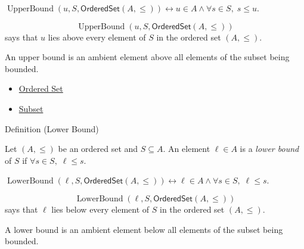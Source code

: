 \begin{remark*}
$\operatorname{UpperBound}(u,S,\mathsf{OrderedSet}(A,\leq))
\leftrightarrow u\in A\wedge \forall s\in S,\;s\leq u$.
\end{remark*}

\begin{remark*}
\[
  \operatorname{UpperBound}(u,S,\mathsf{OrderedSet}(A,\leq))
\] says that $u$
lies above every element of $S$ in the ordered set $(A,\leq)$.
\end{remark*}

\begin{remark*}[Interpretation]
An upper bound is an ambient element above all elements of the subset being
bounded.
\end{remark*}

\begin{dependencies}
\begin{itemize}
  \item \hyperref[def:ordered-set]{Ordered Set}
  \item \hyperref[def:subset]{Subset}
\end{itemize}
\end{dependencies}

\begin{definitionbox}{Definition (Lower Bound)}
\begin{definition}\label{def:lower-bound}
Let $(A,\leq)$ be an ordered set and $S \subseteq A$.
An element $\ell \in A$ is a \emph{lower bound} of $S$ if
$\forall s \in S,\; \ell \leq s$.
\end{definition}
\end{definitionbox}

\begin{remark*}
$\operatorname{LowerBound}(\ell,S,\mathsf{OrderedSet}(A,\leq))
\leftrightarrow \ell\in A\wedge \forall s\in S,\;\ell\leq s$.
\end{remark*}

\begin{remark*}
\[
  \operatorname{LowerBound}(\ell,S,\mathsf{OrderedSet}(A,\leq))
\] says that
$\ell$ lies below every element of $S$ in the ordered set $(A,\leq)$.
\end{remark*}

\begin{remark*}[Interpretation]
A lower bound is an ambient element below all elements of the subset being
bounded.
\end{remark*}

